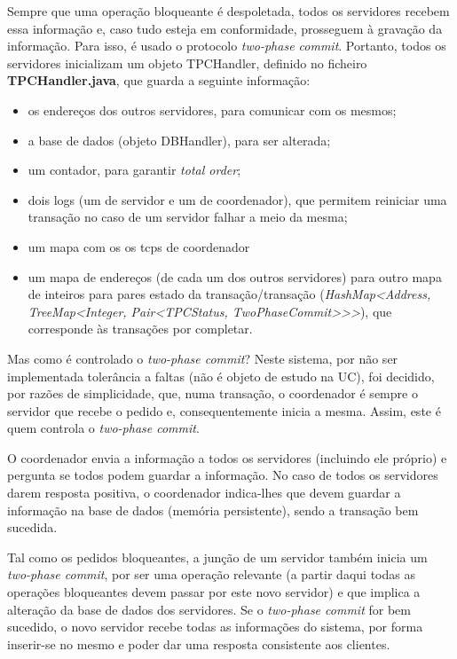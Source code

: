 \documentclass[a4paper]{report}
\begin{document}
		Sempre que uma operação bloqueante é despoletada, todos os servidores recebem essa informação e, caso tudo esteja em conformidade, prosseguem à gravação da informação.
		Para isso, é usado o protocolo \textit{two-phase commit}. Portanto, todos os servidores inicializam um objeto TPCHandler, definido no ficheiro \textbf{TPCHandler.java}, 
		que guarda a seguinte informação:
		\begin{itemize}
		\item os endereços dos outros servidores, para comunicar com os mesmos;
		\item a base de dados (objeto DBHandler), para ser alterada;
		\item um contador, para garantir \textit{total order};
		\item dois logs (um de servidor e um de coordenador), que permitem reiniciar uma transação no caso de um servidor falhar a meio da mesma;
		\item um mapa com os os tcps de coordenador  %
		\item um mapa de endereços (de cada um dos outros servidores) para outro mapa de inteiros para pares estado da transação/transação 
		(\textit{HashMap<Address, TreeMap<Integer, Pair<TPCStatus, TwoPhaseCommit>>>}), que corresponde às transações por completar.
		\end{itemize}
		
		Mas como é controlado o \textit{two-phase commit}?
		Neste sistema, por não ser implementada tolerância a faltas (não é objeto de estudo na UC), foi decidido, por razões de simplicidade, 
		que, numa transação, o coordenador é sempre o servidor que recebe o pedido e, consequentemente inicia a mesma.
		Assim, este é quem controla o \textit{two-phase commit}.

		O coordenador envia a informação a todos os servidores (incluindo ele próprio) e pergunta se todos podem guardar a informação. 
		No caso de todos os servidores darem resposta positiva, o coordenador indica-lhes que devem guardar a informação na base de dados (memória persistente), sendo a transação bem sucedida.


		Tal como os pedidos bloqueantes, a junção de um servidor também inicia um \textit{two-phase commit}, por ser uma operação relevante 
		(a partir daqui todas as operações bloqueantes devem passar por este novo servidor) e que implica a alteração da base de dados dos servidores.
		Se o \textit{two-phase commit} for bem sucedido, o novo servidor recebe todas as informações do sistema, por forma inserir-se no mesmo e poder dar uma resposta consistente aos clientes.
\end{document}

